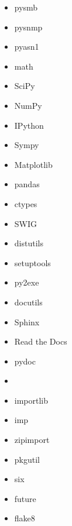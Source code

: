 \documentclass{article}
\begin{document}
\begin{enumerate}
\begin{itemize}
            \item pysmb

            \item pysnmp

            \item pyasn1

            \item math
            \item SciPy
            \item NumPy
            \item IPython
            \item Sympy
            \item Matplotlib
            \item pandas

            \item ctypes
            \item SWIG

            \item distutils
            \item setuptools
            \item py2exe

            \item docutils
            \item Sphinx
            \item Read the Docs
            \item pydoc

            \item

            \item importlib
            \item imp
            \item zipimport
            \item pkgutil

            \item six
            \item future
            \item flake8


\end{itemize}
\end{enumerate}
\end{document}

